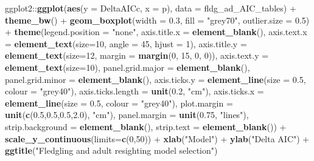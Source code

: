 \documentclass[]{article}
\newenvironment{Shaded}{\begin{snugshade}}{\end{snugshade}}
\newcommand{\KeywordTok}[1]{\textcolor[rgb]{0.13,0.29,0.53}{\textbf{{#1}}}}
\newcommand{\DataTypeTok}[1]{\textcolor[rgb]{0.13,0.29,0.53}{{#1}}}
\newcommand{\DecValTok}[1]{\textcolor[rgb]{0.00,0.00,0.81}{{#1}}}
\newcommand{\FloatTok}[1]{\textcolor[rgb]{0.00,0.00,0.81}{{#1}}}
\newcommand{\StringTok}[1]{\textcolor[rgb]{0.31,0.60,0.02}{{#1}}}
\newcommand{\NormalTok}[1]{{#1}}
\begin{document}
\begin{Shaded}
\begin{Highlighting}[]
\NormalTok{ggplot2::}\KeywordTok{ggplot}\NormalTok{(}\KeywordTok{aes}\NormalTok{(}\DataTypeTok{y =} \NormalTok{DeltaAICc, }\DataTypeTok{x =} \NormalTok{p), }\DataTypeTok{data =} \NormalTok{fldg_ad_AIC_tables) +}\StringTok{ }
\StringTok{          }\KeywordTok{theme_bw}\NormalTok{() +}
\StringTok{          }\KeywordTok{geom_boxplot}\NormalTok{(}\DataTypeTok{width =} \FloatTok{0.3}\NormalTok{, }\DataTypeTok{fill =} \StringTok{"grey70"}\NormalTok{, }\DataTypeTok{outlier.size =} \FloatTok{0.5}\NormalTok{) +}
\StringTok{          }\KeywordTok{theme}\NormalTok{(}\DataTypeTok{legend.position =} \StringTok{"none"}\NormalTok{,}
                \DataTypeTok{axis.title.x =} \KeywordTok{element_blank}\NormalTok{(),}
                \DataTypeTok{axis.text.x  =} \KeywordTok{element_text}\NormalTok{(}\DataTypeTok{size=}\DecValTok{10}\NormalTok{, }\DataTypeTok{angle =} \DecValTok{45}\NormalTok{, }\DataTypeTok{hjust =} \DecValTok{1}\NormalTok{), }
                \DataTypeTok{axis.title.y =} \KeywordTok{element_text}\NormalTok{(}\DataTypeTok{size=}\DecValTok{12}\NormalTok{, }\DataTypeTok{margin =} \KeywordTok{margin}\NormalTok{(}\DecValTok{0}\NormalTok{, }\DecValTok{15}\NormalTok{, }\DecValTok{0}\NormalTok{, }\DecValTok{0}\NormalTok{)),}
                \DataTypeTok{axis.text.y  =} \KeywordTok{element_text}\NormalTok{(}\DataTypeTok{size=}\DecValTok{10}\NormalTok{),}
                \DataTypeTok{panel.grid.major =} \KeywordTok{element_blank}\NormalTok{(),}
                \DataTypeTok{panel.grid.minor =} \KeywordTok{element_blank}\NormalTok{(),}
                \DataTypeTok{axis.ticks.y =} \KeywordTok{element_line}\NormalTok{(}\DataTypeTok{size =} \FloatTok{0.5}\NormalTok{, }\DataTypeTok{colour =} \StringTok{"grey40"}\NormalTok{),}
                \DataTypeTok{axis.ticks.length =} \KeywordTok{unit}\NormalTok{(}\FloatTok{0.2}\NormalTok{, }\StringTok{"cm"}\NormalTok{),}
                \DataTypeTok{axis.ticks.x =} \KeywordTok{element_line}\NormalTok{(}\DataTypeTok{size =} \FloatTok{0.5}\NormalTok{, }\DataTypeTok{colour =} \StringTok{"grey40"}\NormalTok{),}
                \DataTypeTok{plot.margin =} \KeywordTok{unit}\NormalTok{(}\KeywordTok{c}\NormalTok{(}\FloatTok{0.5}\NormalTok{,}\FloatTok{0.5}\NormalTok{,}\FloatTok{0.5}\NormalTok{,}\FloatTok{2.0}\NormalTok{), }\StringTok{"cm"}\NormalTok{),}
                \DataTypeTok{panel.margin =} \KeywordTok{unit}\NormalTok{(}\FloatTok{0.75}\NormalTok{, }\StringTok{"lines"}\NormalTok{),}
                \DataTypeTok{strip.background =} \KeywordTok{element_blank}\NormalTok{(), }
                \DataTypeTok{strip.text =} \KeywordTok{element_blank}\NormalTok{()) +}
\StringTok{          }\KeywordTok{scale_y_continuous}\NormalTok{(}\DataTypeTok{limits=}\KeywordTok{c}\NormalTok{(}\DecValTok{0}\NormalTok{,}\DecValTok{50}\NormalTok{)) +}
\StringTok{          }\KeywordTok{xlab}\NormalTok{(}\StringTok{"Model"}\NormalTok{) +}\StringTok{ }
\StringTok{          }\KeywordTok{ylab}\NormalTok{(}\StringTok{"Delta AIC"}\NormalTok{) +}
\StringTok{          }\KeywordTok{ggtitle}\NormalTok{(}\StringTok{"Fledgling and adult resighting model selection"}\NormalTok{)}
\end{Highlighting}
\end{Shaded}
\end{document}
